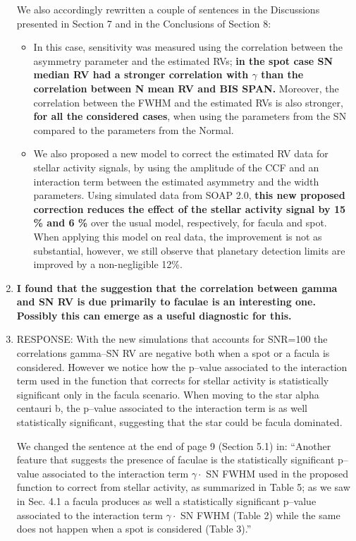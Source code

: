 \documentclass[11pt]{article}   	%
\begin{document}
\begin{enumerate}
We also accordingly rewritten a couple of sentences in the Discussions presented in Section 7 and in the Conclusions of Section 8:
\begin{itemize}
\item In this case, sensitivity was measured using the correlation between the asymmetry parameter and the estimated RVs; {\bf{in the spot case SN median RV had a stronger correlation with $\gamma$ than the correlation between N mean RV and BIS SPAN.}} Moreover, the correlation between the FWHM and the estimated RVs is also stronger, {\bf{for all the considered cases}}, when using the parameters from the SN compared to the parameters from the Normal. 

\item We also proposed a new model to correct the estimated RV data for stellar activity signals, by using the amplitude of the CCF and an interaction term between the estimated asymmetry and the width parameters. Using simulated data from SOAP 2.0, {\bf{this new proposed correction reduces the effect of the stellar activity signal by 15 \% and 6 \%}} over the usual model, respectively, for facula and spot. When applying this model on real data, the improvement is not as substantial, however, we still observe that planetary detection limits are improved by a non-negligible 12\%.
\end{itemize}


\bigskip
%
%
\item {\bf I found that the suggestion that the correlation between gamma and SN RV is due primarily to faculae is an interesting one. Possibly this can emerge as a useful diagnostic for this.}
%
\item[]  RESPONSE:  With the new simulations that accounts for SNR=100 the correlations gamma--SN RV are negative both when a spot or a facula is considered. However we notice how the p--value associated to the interaction term used in the function that corrects for stellar activity is statistically significant only in the facula scenario. When moving to the star alpha centauri b, the p--value associated to the interaction term is as well statistically significant, suggesting that the star could be facula dominated.

We changed the sentence at the end of page 9 (Section 5.1) in: 
``Another feature that suggests the presence of faculae is the statistically significant p--value associated to the interaction term $\gamma \cdot$ SN FWHM used in the proposed function to correct from stellar activity, as summarized in Table 5; as we saw in Sec. 4.1 a facula produces as well a statistically significant p--value associated to the  interaction term $\gamma \cdot$ SN FWHM (Table 2) while the same does not happen when a spot is considered (Table 3).''


\end{enumerate}
\end{document}
